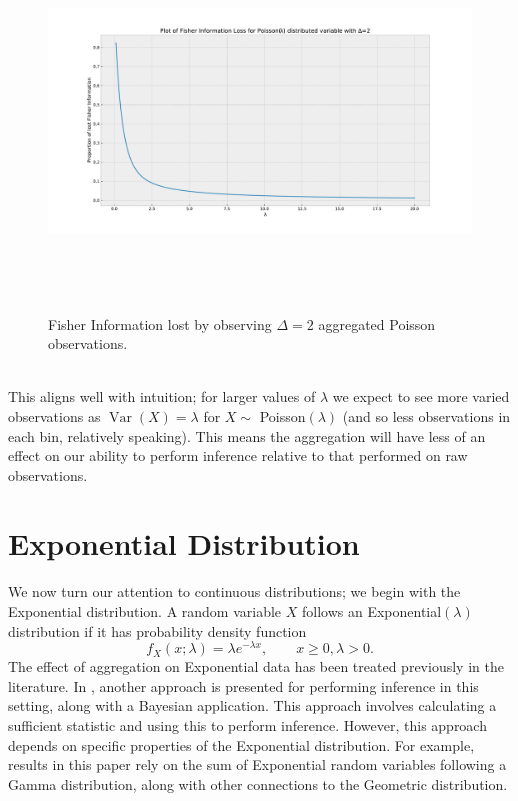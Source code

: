 \documentclass[11pt,a4,twosided,singlespacing,titlepagenumber=on,numbers=endperiod]{scrreprt}
\numberwithin{equation}{chapter} %
\theoremstyle{remark}
\DeclareMathOperator{\var}{Var}
\begin{document}
\begin{figure}[!h]
	\includegraphics[height=10cm, width=14cm]{poisson_info_loss.pdf}
	\centering
	\caption{Fisher Information lost by observing $\Delta=2$ aggregated Poisson observations.}
	\label{fig:poisson_info_loss}
\end{figure}\\\noindent
This aligns well with intuition; for larger values of $\lambda$ we expect to see more varied observations as $\var(X) = \lambda$ for $X \sim$ Poisson$(\lambda)$ (and so less observations in each bin, relatively speaking). This means the aggregation will have less of an effect on our ability to perform inference relative to that performed on raw observations.

\newpage
\section{Exponential Distribution}
We now turn our attention to continuous distributions; we begin with the Exponential distribution. A random variable $X$ follows an Exponential$(\lambda)$ distribution if it has probability density function
\begin{equation*}
	f_X(x; \lambda) = \lambda e^{- \lambda x}, \quad \quad x \geq 0, \lambda > 0.
\end{equation*}
The effect of aggregation on Exponential data has been treated previously in the literature. In \cite{rounded_exp}, another approach is presented for performing inference in this setting, along with a Bayesian application. This approach involves calculating a sufficient statistic and using this to perform inference. However, this approach depends on specific properties of the Exponential distribution. For example, results in this paper rely on the sum of Exponential random variables following a Gamma distribution, along with other connections to the Geometric distribution. 
\end{document}

